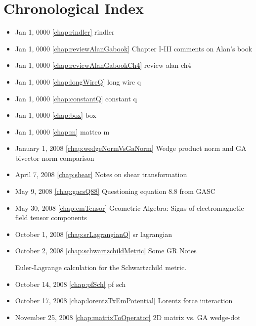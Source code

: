 \chapter{Chronological Index}
\label{chap:Chronology}

\begin{itemize}

\item Jan 1, 0000 \ref{chap:rindler} rindler

\item Jan 1, 0000 \ref{chap:reviewAlanGabook} Chapter I-III comments on Alan's book

\item Jan 1, 0000 \ref{chap:reviewAlanGabookCh4} review alan ch4

\item Jan 1, 0000 \ref{chap:longWireQ} long wire q

\item Jan 1, 0000 \ref{chap:constantQ} constant q

\item Jan 1, 0000 \ref{chap:box} box

\item Jan 1, 0000 \ref{chap:m} matteo m

\item January 1, 2008 \ref{chap:wedgeNormVsGaNorm} Wedge product norm and GA bivector norm comparison

\item April 7, 2008 \ref{chap:shear} Notes on shear transformation

\item May 9, 2008 \ref{chap:gacsQ88} Questioning equation 8.8 from GASC

\item May 30, 2008 \ref{chap:emTensor} Geometric Algebra: Signs of electromagnetic field tensor components

\item October 1, 2008 \ref{chap:srLagrangianQ} sr lagrangian

\item October 2, 2008 \ref{chap:schwartzchildMetric} Some GR Notes

Euler-Lagrange calculation for the Schwartzchild metric.\item October 14, 2008 \ref{chap:pfSch} pf sch

\item October 17, 2008 \ref{chap:lorentzTxEmPotential} Lorentz force interaction

\item November 25, 2008 \ref{chap:matrixToOperator} 2D matrix vs. GA wedge-dot


\end{itemize}
